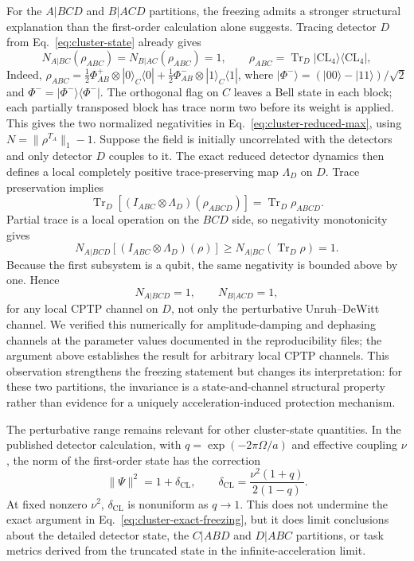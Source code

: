 \documentclass[pdflatex,sn-mathphys-num]{sn-jnl}
\newcommand{\Tr}{\operatorname{Tr}}
\begin{document}
For the $A|BCD$ and $B|ACD$ partitions, the freezing admits a stronger structural explanation than the first-order calculation alone suggests. Tracing detector $D$ from Eq.~\eqref{eq:cluster-state} already gives
\begin{equation}
N_{A|BC}(\rho_{ABC})=N_{B|AC}(\rho_{ABC})=1,
\qquad \rho_{ABC}=\Tr_D|\mathrm{CL}_{4}\rangle\langle\mathrm{CL}_{4}|,
\label{eq:cluster-reduced-max}
\end{equation}
Indeed, $\rho_{ABC}=\frac12\Phi^+_{AB}\otimes|0\rangle_C\langle0|+\frac12\Phi^-_{AB}\otimes|1\rangle_C\langle1|$, where $|\Phi^-\rangle=(|00\rangle-|11\rangle)/\sqrt2$ and $\Phi^-=|\Phi^-\rangle\langle\Phi^-|$. The orthogonal flag on $C$ leaves a Bell state in each block; each partially transposed block has trace norm two before its weight is applied. This gives the two normalized negativities in Eq.~\eqref{eq:cluster-reduced-max}, using $N=\|\rho^{T_A}\|_1-1$. Suppose the field is initially uncorrelated with the detectors and only detector $D$ couples to it. The exact reduced detector dynamics then defines a local completely positive trace-preserving map $\Lambda_D$ on $D$. Trace preservation implies
\begin{equation}
\Tr_D[(I_{ABC}\otimes\Lambda_D)(\rho_{ABCD})]=\Tr_D\rho_{ABCD}.
\label{eq:cluster-local-channel}
\end{equation}
Partial trace is a local operation on the $BCD$ side, so negativity monotonicity gives
\begin{equation}
N_{A|BCD}[(I_{ABC}\otimes\Lambda_D)(\rho)]
\ge N_{A|BC}(\Tr_D\rho)=1.
\end{equation}
Because the first subsystem is a qubit, the same negativity is bounded above by one. Hence
\begin{equation}
N_{A|BCD}=1,
\qquad N_{B|ACD}=1,
\label{eq:cluster-exact-freezing}
\end{equation}
for any local CPTP channel on $D$, not only the perturbative Unruh--DeWitt channel. We verified this numerically for amplitude-damping and dephasing channels at the parameter values documented in the reproducibility files; the argument above establishes the result for arbitrary local CPTP channels. This observation strengthens the freezing statement but changes its interpretation: for these two partitions, the invariance is a state-and-channel structural property rather than evidence for a uniquely acceleration-induced protection mechanism.

The perturbative range remains relevant for other cluster-state quantities. In the published detector calculation, with $q=\exp(-2\pi\Omega/a)$ and effective coupling $\nu$, the norm of the first-order state has the correction
\begin{equation}
\|\Psi\|^2=1+\delta_{\mathrm{CL}},\qquad
\delta_{\mathrm{CL}}=\frac{\nu^2(1+q)}{2(1-q)}.
\label{eq:cluster-perturbative-control}
\end{equation}
At fixed nonzero $\nu^2$, $\delta_{\mathrm{CL}}$ is nonuniform as $q\to1$. This does not undermine the exact argument in Eq.~\eqref{eq:cluster-exact-freezing}, but it does limit conclusions about the detailed detector state, the $C|ABD$ and $D|ABC$ partitions, or task metrics derived from the truncated state in the infinite-acceleration limit.
\end{document}

